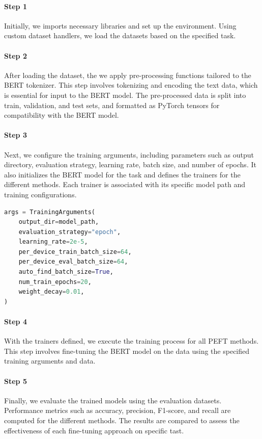\paragraph{Step 1} Initially, we imports necessary libraries and set up the environment. Using custom dataset handlers, we load the datasets based on the specified task. 

\paragraph{Step 2} After loading the dataset, the we apply pre-processing functions tailored to the BERT tokenizer. This step involves tokenizing and encoding the text data, which is essential for input to the BERT model. The pre-processed data is split into train, validation, and test sets, and formatted as PyTorch tensors for compatibility with the BERT model.

\paragraph{Step 3} Next, we configure the training arguments, including parameters such as output directory, evaluation strategy, learning rate, batch size, and number of epochs. It also initializes the BERT model for the task and defines the trainers for the different methods. Each trainer is associated with its specific model path and training configurations.
\begin{lstlisting}[language=Python, caption={Training Arguments}, label={lst:training_arguments}]
args = TrainingArguments(
    output_dir=model_path,
    evaluation_strategy="epoch",
    learning_rate=2e-5,
    per_device_train_batch_size=64,
    per_device_eval_batch_size=64,
    auto_find_batch_size=True,
    num_train_epochs=20,
    weight_decay=0.01,
)
\end{lstlisting}



\paragraph{Step 4} With the trainers defined, we execute the training process for all PEFT methods. This step involves fine-tuning the BERT model on the data using the specified training arguments and data. 

\paragraph{Step 5} Finally, we evaluate the trained models using the evaluation datasets. Performance metrics such as accuracy, precision, F1-score, and recall are computed for the different methods. The results are compared to assess the effectiveness of each fine-tuning approach on specific tast.
